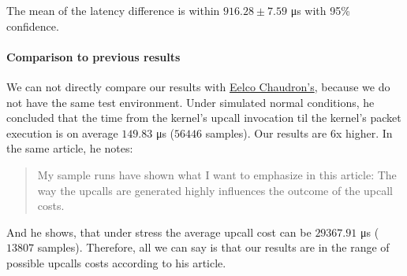 The mean of the latency difference is within $916.28 \pm 7.59$ \si{\micro\second} with 95\% confidence. 

\paragraph{Comparison to previous results}

We can not directly compare our results with \href{https://developers.redhat.com/articles/2022/02/07/investigating-cost-open-vswitch-upcalls-linux}{Eelco Chaudron's}, because we do not have the same test environment. Under simulated normal conditions, he concluded that the time from the kernel's upcall invocation til the kernel's packet execution is on average $149.83$ \si{\micro\second} ($56446$ samples). Our results are 6x higher. In the same article, he notes:

\begin{quote}
My sample runs have shown what I want to emphasize in this article: The way the upcalls are generated highly influences the outcome of the upcall costs.
\end{quote}

And he shows, that under stress the average upcall cost can be $29367.91$ \si{\micro\second} ($13807$ samples). Therefore, all we can say is that our results are in the range of possible upcalls costs according to his article.

%


